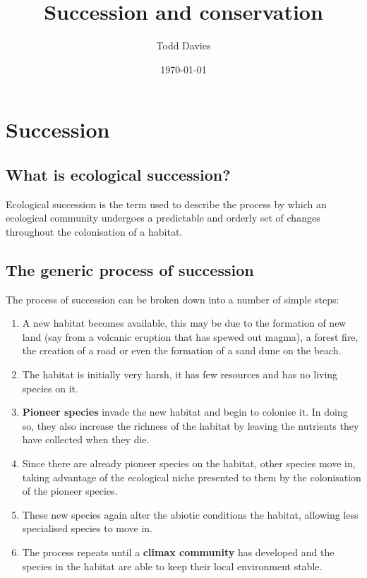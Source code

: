 \documentclass{article}
\title{Succession and conservation}
\author{Todd Davies}
\date{\today}
\begin{document}
\lhead{\today}

\maketitle

\section*{Succession}

\subsection*{What is ecological succession?}
\thispagestyle{empty}
Ecological succession is the term used to describe the process by which an
ecological community undergoes a predictable and orderly set of changes
throughout the colonisation of a habitat.

\subsection*{The generic process of succession}
The process of succession can be broken down into a number of simple steps:
\begin{enumerate}
	\item A new habitat becomes available, this may be due to the formation of
	new land (say from a volcanic eruption that has spewed out magma), a forest
	fire, the creation of a road or even the formation of a sand dune on the
	beach.
	\item The habitat is initially very harsh, it has few resources and has no
	living species on it.
	\item \textbf{Pioneer species} invade the new habitat and begin to colonise
	it. In doing so, they also increase the richness of the habitat by leaving
	the nutrients they have collected when they die.
	\item Since there are already pioneer species on the habitat, other species
	move in, taking advantage of the ecological niche presented to them by the
	colonisation of the pioneer species.
	\item These new species again alter the abiotic conditions the habitat,
	allowing less specialised species to move in.
	\item The process repeats until a \textbf{climax community} has developed
	and the species in the habitat are able to keep their local environment
	stable.
\end{enumerate}
\end{document}
